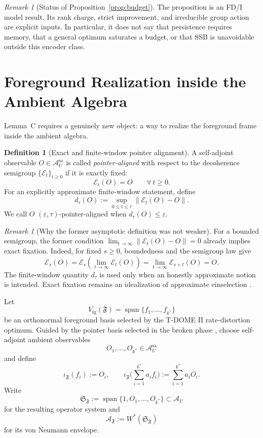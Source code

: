 \documentclass[12pt]{article}
\theoremstyle{definition}
\newtheorem{definition}[theorem]{Definition}
\theoremstyle{remark}
\newtheorem{remark}[theorem]{Remark}
\begin{document}
\begin{remark}[Status of Proposition~\ref{prop:budget}]
The proposition is an FD/I model result. Its rank charge, strict
improvement, and irreducible group action are explicit inputs. In
particular, it does not say that persistence requires memory, that a
general optimum saturates a budget, or that SSB is unavoidable outside
this encoder class.
\end{remark}

\section{Foreground Realization inside the Ambient Algebra}\label{sec:foreground}

Lemma~C requires a genuinely new object: a way to realize the
foreground frame inside the ambient algebra.

\begin{definition}[Exact and finite-window pointer alignment]\label{def:pointer}
A self-adjoint observable \(O\in\mathcal A_U^{\mathrm{sa}}\) is called
\emph{pointer-aligned} with respect to the decoherence semigroup
\(\{\mathcal E_t\}_{t\ge 0}\) if it is exactly fixed:
\[
\mathcal E_t(O)=O
\qquad
\forall\,t\ge0.
\]
For an explicitly approximate finite-window statement, define
\[
d_\tau(O):=\sup_{0\le t\le\tau}
\|\mathcal E_t(O)-O\|.
\]
We call \(O\) \((\varepsilon,\tau)\)-pointer-aligned when
\(d_\tau(O)\le\varepsilon\).
\end{definition}

\begin{remark}[Why the former asymptotic definition was not weaker]
For a bounded semigroup, the former condition
\(\lim_{t\to\infty}\|\mathcal E_t(O)-O\|=0\) already implies exact
fixation. Indeed, for fixed \(s\ge0\), boundedness and the semigroup law
give
\[
\mathcal E_s(O)
=\mathcal E_s\!\left(\lim_{t\to\infty}\mathcal E_t(O)\right)
=\lim_{t\to\infty}\mathcal E_{s+t}(O)=O.
\]
The finite-window quantity \(d_\tau\) is used only when an honestly
approximate notion is intended. Exact fixation remains an idealization
of approximate einselection \cite{Zurek2003,Zurek2009}.
\end{remark}

Let
\[
V_{\mathrm{fg}}(\mathfrak F)=\operatorname{span}\{f_1,\dots,f_{k^*}\}
\]
be an orthonormal foreground basis selected by the T-DOME II
rate-distortion optimum. Guided by the pointer basis selected in the
broken phase \cite{TDOMEII}, choose self-adjoint ambient observables
\[
O_1,\dots,O_{k^*}\in\mathcal A_U^{\mathrm{sa}}
\]
and define
\[
\iota_{\mathfrak F}(f_i):=O_i,
\qquad
\iota_{\mathfrak F}\Big(\sum_{i=1}^{k^*} a_i f_i\Big)
:=
\sum_{i=1}^{k^*} a_i O_i.
\]
Write
\[
\mathfrak S_{\mathfrak F}
:=
\operatorname{span}\{1,O_1,\dots,O_{k^*}\}
\subset\mathcal A_U
\]
for the resulting operator system and
\[
\mathcal A_{\mathfrak F}:=W^*(\mathfrak S_{\mathfrak F})
\]
for its von Neumann envelope.
\end{document}
